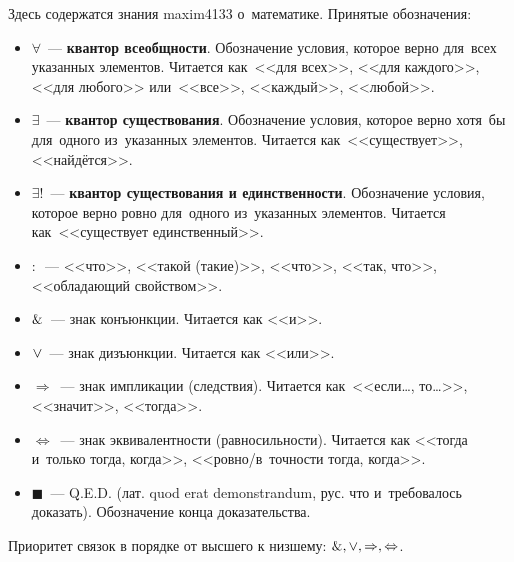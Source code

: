 Здесь содержатся знания maxim4133 о~математике. Принятые обозначения:
\begin{itemize}
	\item $\forall$~--- \textbf{квантор всеобщности}.
	Обозначение условия, которое верно для~всех указанных элементов.
	Читается как~<<для всех>>, <<для каждого>>, <<для любого>> или~<<все>>, <<каждый>>, <<любой>>.
	
	\item $\exists$~--- \textbf{квантор существования}.
	Обозначение условия, которое верно хотя~бы для~одного из~указанных элементов.
	Читается как~<<существует>>, <<найдётся>>.
	
	\item $\exists!$~--- \textbf{квантор существования и единственности}.
	Обозначение условия, которое верно ровно для~одного из~указанных элементов.
	Читается как~<<существует единственный>>.
	
	\item $\colon$~--- <<что>>, <<такой (такие)>>, <<что>>, <<так, что>>, <<обладающий свойством>>.
	
	\item $\mathrel{\&}$~--- знак конъюнкции. Читается как <<и>>.
	
	\item $\mathrel{\lor}$~--- знак дизъюнкции. Читается как <<или>>.
	
	\item $\Rightarrow$~--- знак импликации (следствия).
	Читается как~<<если\dots, то\dots>>, <<значит>>, <<тогда>>.
	
	\item $\Leftrightarrow$~--- знак эквивалентности (равносильности).
	Читается как <<тогда и~только тогда, когда>>, <<ровно/в~точности тогда, когда>>.
	
	\item $\scriptstyle \blacksquare$~--- Q.E.D. (лат. quod erat demonstrandum, рус. что и~требовалось доказать).
	Обозначение конца доказательства.
\end{itemize}

Приоритет связок в порядке от высшего к низшему: $\mathrel{\&}, \mathrel{\lor}, \Rightarrow, \Leftrightarrow$.